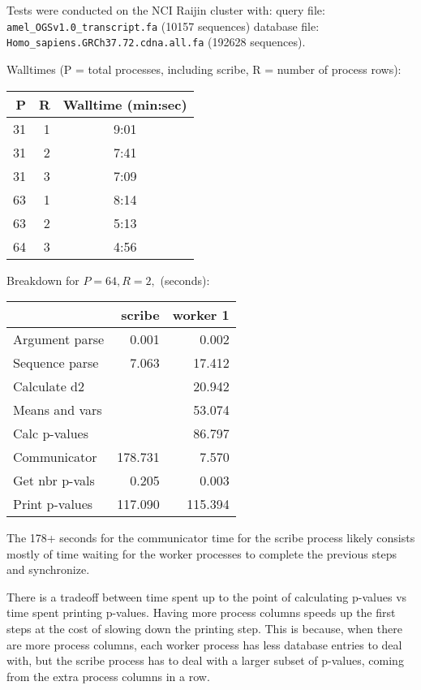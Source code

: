 \documentclass[11pt]{report}
\begin{document}
Tests were conducted on the NCI Raijin cluster with:
query file: 
\newline
\verb!amel_OGSv1.0_transcript.fa! (10157 sequences)
database file: 
\newline
\verb!Homo_sapiens.GRCh37.72.cdna.all.fa! (192628 sequences).

Walltimes (P = total processes, including scribe, R = number of process rows):

\begin{center}
\begin{tabular}{|rrc|}
\hline
P  &R &Walltime (min:sec) \\
\hline
31 &1 &9:01 \\
31 &2 &7:41 \\
31 &3 &7:09 \\
63 &1 &8:14 \\
63 &2 &5:13 \\
64 &3 &4:56 \\
\hline
\end{tabular} 
\end{center}

Breakdown for $P=64, R=2,$ (seconds):

\begin{center}
\begin{tabular}{|l|rr|}
\hline
               &scribe  &worker 1 \\
\hline
Argument parse &  0.001 &  0.002 \\
Sequence parse &  7.063 & 17.412 \\
Calculate d2   &        & 20.942 \\
Means and vars &        & 53.074 \\
Calc p-values  &        & 86.797 \\
Communicator   &178.731 &  7.570 \\
Get nbr p-vals &  0.205 &  0.003 \\
Print p-values &117.090 &115.394 \\
\hline
\end{tabular} 
\end{center}

The 178+ seconds for the communicator time for the scribe process likely 
consists mostly of time waiting for the worker processes to complete the 
previous steps and synchronize.

There is a tradeoff between time spent up to the point of calculating p-values 
vs time spent printing p-values. Having more process columns speeds up the 
first steps at the cost of slowing down the printing step. This is because, 
when there are more process columns, each worker process has less database 
entries to deal with, but the scribe process has to deal with a larger subset 
of p-values, coming from the extra process columns in a row.
\end{document}
